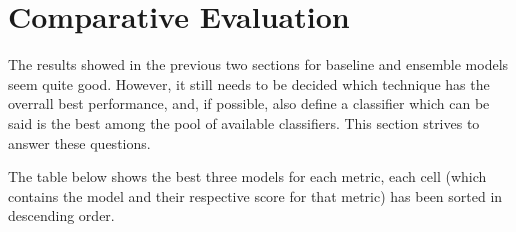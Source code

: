 \documentclass[epsfig,a4paper,11pt,titlepage,twoside,openany]{book}
\begin{document}
\section{Comparative Evaluation}
\label{sec:comparative-evaluation}

The results showed in the previous two sections for baseline and ensemble models seem quite good. However, it still needs to be decided which technique has the overrall best performance, and, if possible, also define a classifier which can be said is the best among the pool of available classifiers. This section strives to answer these questions. 

The table below shows the best three models for each metric, each cell (which contains the model and their respective score for that metric) has been sorted in descending order. 
\end{document}
